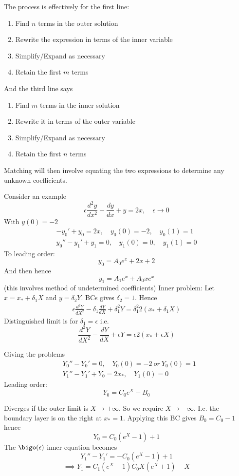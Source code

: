 \documentclass{/home/janmebows/Documents/LatexTemplates/myassignment}
\begin{document}
The process is effectively for the first line:
\begin{enumerate}
    \item Find $n$ terms in the outer solution
    \item Rewrite the expression in terms of the inner variable
    \item Simplify/Expand as necessary
    \item Retain the first $m$ terms 
\end{enumerate}
And the third line says
\begin{enumerate}
    \item Find $m$ terms in the inner solution
    \item Rewrite it in terms of the outer variable
    \item Simplify/Expand as necessary
    \item Retain the first $n$ terms 
\end{enumerate}
Matching will then involve equating the two expressions to determine any unknown coefficients.

Consider an example
\[\epsilon \frac{d^2y}{dx^2} - \frac{dy}{dx} + y = 2x,\quad \epsilon\to 0\]
With $y(0)= -2$
\begin{align*}
    -y_0' + y_0 = 2x, \quad y_0(0) = -2,\quad y_0(1) = 1\\
    y_0'' - y_1' + y_1 = 0,\quad y_1(0) = 0,\quad y_1(1)=0
\end{align*}
To leading order:
\[y_0 = A_0e^x + 2x +2\]
And then hence
\[y_1 = A_1e^{x} + A_0x e^x\]
(this involves method of undetermined coefficients)
Inner problem:
Let $x  = x_* + \delta_1 X$ and $y = \delta_2 Y$. BCs gives $\delta_2 =1$.
Hence
\begin{align*}
    \epsilon \frac{d^2Y}{dX^2} - \delta_1 \frac{dY}{dX} + \delta_1^2 Y = \delta_1^2 2(x_* + \delta_1 X)
\end{align*}
Distinguished limit is for $\delta_1 = \epsilon$ i.e.
\[\frac{d^2 Y}{dX^2} - \frac{dY}{dX} + \epsilon Y = \epsilon 2(x_* + \epsilon X)\]


Giving the problems
\begin{align*}
    &Y_0'' - Y_0' = 0,\quad Y_0(0)=-2 \ or \ Y_0(0)=1\\
    &Y_1 '' - Y_1' + Y_0 = 2x_*,\quad Y_1(0)=0
\end{align*}
Leading order:
\[Y_0 = C_0e^X - B_0\]

Diverges if the outer limit is $X\to +\infty$. So we require $X\to -\infty$. I.e. the boundary layer is on the right at $x_* = 1$. Applying this BC gives $B_0 = C_0 -1$ hence
\[Y_0 = C_0(e^X -1) +1\]
The $\bigo (\epsilon)$ inner equation becomes
\[Y_1'' - Y_1' = -C_0 (e^X -1 )+1\]
\[\implies Y_1 = C_1(e^X -1) C_0 X(e^X + 1)-X\]
\end{document}
